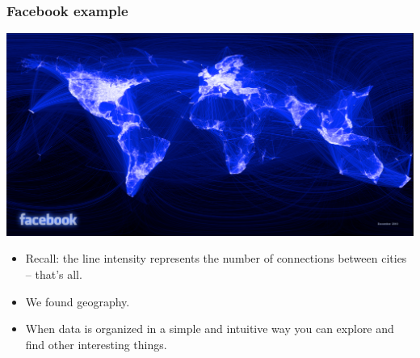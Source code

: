 \documentclass{beamer} %
\newcommand{\1}{\mathbb{1}}
\begin{document}
\begin{frame}[t]\frametitle{Facebook example}
	\begin{center}
		\includegraphics[scale = 0.05]{./visualization/facebook.jpg}
	\end{center}
    
    \begin{itemize}
    	\item Recall: the line intensity represents the number of connections between cities -- that's all. 
    	\item We found geography.
    	\item When data is organized in a simple and intuitive way you can explore and find other interesting things.
    \end{itemize}
\end{frame}
\end{document}

